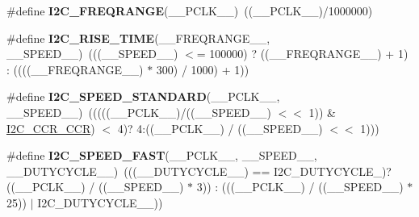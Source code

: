 \begin{DoxyCompactItemize}
\item 
\#define {\bfseries I2\+C\+\_\+\+F\+R\+E\+Q\+R\+A\+N\+GE}(\+\_\+\+\_\+\+P\+C\+L\+K\+\_\+\+\_\+)~((\+\_\+\+\_\+\+P\+C\+L\+K\+\_\+\+\_\+)/1000000)\hypertarget{group___i2_c___private___macros_ga9b4e4686872c7b0bd9daed9049d0c431}{}\label{group___i2_c___private___macros_ga9b4e4686872c7b0bd9daed9049d0c431}

\item 
\#define {\bfseries I2\+C\+\_\+\+R\+I\+S\+E\+\_\+\+T\+I\+ME}(\+\_\+\+\_\+\+F\+R\+E\+Q\+R\+A\+N\+G\+E\+\_\+\+\_\+,  \+\_\+\+\_\+\+S\+P\+E\+E\+D\+\_\+\+\_\+)~(((\+\_\+\+\_\+\+S\+P\+E\+E\+D\+\_\+\+\_\+) $<$= 100000) ? ((\+\_\+\+\_\+\+F\+R\+E\+Q\+R\+A\+N\+G\+E\+\_\+\+\_\+) + 1) \+: ((((\+\_\+\+\_\+\+F\+R\+E\+Q\+R\+A\+N\+G\+E\+\_\+\+\_\+) $\ast$ 300) / 1000) + 1))\hypertarget{group___i2_c___private___macros_ga27cae7b1432cd160ab708e1548ba3165}{}\label{group___i2_c___private___macros_ga27cae7b1432cd160ab708e1548ba3165}

\item 
\#define {\bfseries I2\+C\+\_\+\+S\+P\+E\+E\+D\+\_\+\+S\+T\+A\+N\+D\+A\+RD}(\+\_\+\+\_\+\+P\+C\+L\+K\+\_\+\+\_\+,  \+\_\+\+\_\+\+S\+P\+E\+E\+D\+\_\+\+\_\+)~(((((\+\_\+\+\_\+\+P\+C\+L\+K\+\_\+\+\_\+)/((\+\_\+\+\_\+\+S\+P\+E\+E\+D\+\_\+\+\_\+) $<$$<$ 1)) \& \hyperlink{group___peripheral___registers___bits___definition_ga5c8cb2bd83dd7dbdcf6ca4bbf4a841de}{I2\+C\+\_\+\+C\+C\+R\+\_\+\+C\+CR}) $<$ 4)? 4\+:((\+\_\+\+\_\+\+P\+C\+L\+K\+\_\+\+\_\+) / ((\+\_\+\+\_\+\+S\+P\+E\+E\+D\+\_\+\+\_\+) $<$$<$ 1)))\hypertarget{group___i2_c___private___macros_gaa71590c93b126e79fc86afbc819742b3}{}\label{group___i2_c___private___macros_gaa71590c93b126e79fc86afbc819742b3}

\item 
\#define {\bfseries I2\+C\+\_\+\+S\+P\+E\+E\+D\+\_\+\+F\+A\+ST}(\+\_\+\+\_\+\+P\+C\+L\+K\+\_\+\+\_\+,  \+\_\+\+\_\+\+S\+P\+E\+E\+D\+\_\+\+\_\+,  \+\_\+\+\_\+\+D\+U\+T\+Y\+C\+Y\+C\+L\+E\+\_\+\+\_\+)~(((\+\_\+\+\_\+\+D\+U\+T\+Y\+C\+Y\+C\+L\+E\+\_\+\+\_\+) == I2\+C\+\_\+\+D\+U\+T\+Y\+C\+Y\+C\+L\+E\+\_)? ((\+\_\+\+\_\+\+P\+C\+L\+K\+\_\+\+\_\+) / ((\+\_\+\+\_\+\+S\+P\+E\+E\+D\+\_\+\+\_\+) $\ast$ 3)) \+: (((\+\_\+\+\_\+\+P\+C\+L\+K\+\_\+\+\_\+) / ((\+\_\+\+\_\+\+S\+P\+E\+E\+D\+\_\+\+\_\+) $\ast$ 25)) $\vert$ I2\+C\+\_\+\+D\+U\+T\+Y\+C\+Y\+C\+L\+E\+\_\+\_))\hypertarget{group___i2_c___private___macros_ga9e5a85344d70ab05020e41ba24566f57}{}\label{group___i2_c___private___macros_ga9e5a85344d70ab05020e41ba24566f57}


\end{DoxyCompactItemize}
